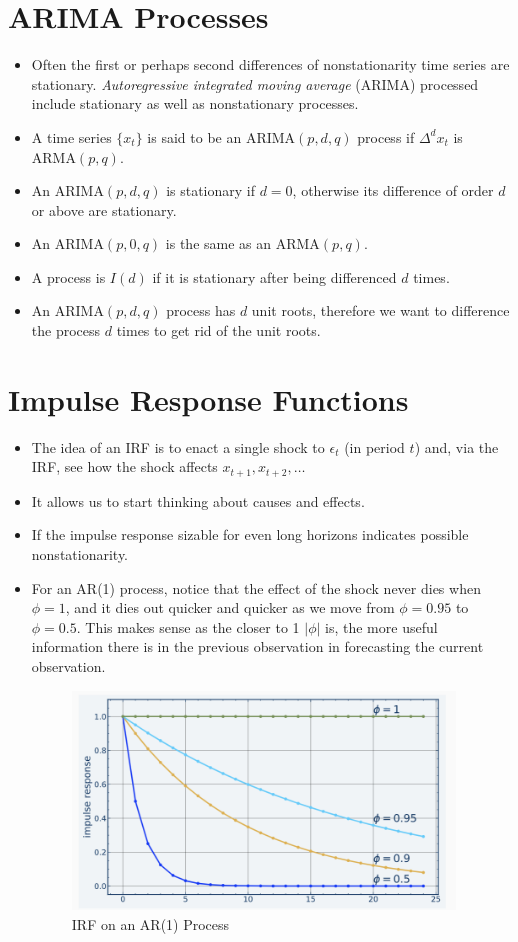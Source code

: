 \documentclass[11pt]{article}
\begin{document}
\section{ARIMA Processes}
\begin{itemize}
    \item Often the first or perhaps second differences of nonstationarity time series are 
    stationary. \textit{Autoregressive integrated moving average} (ARIMA) processed include 
    stationary as well as nonstationary processes.
    \item A time series $\{x_t\}$ is said to be an $\text{ARIMA}(p,d,q)$ process if $\Delta^d 
    x_t$ is $\text{ARMA}(p,q)$.
    \item An $\text{ARIMA}(p,d,q)$ is stationary if $d=0$, otherwise its difference of order 
    $d$ or above are stationary. 
    \item An $\text{ARIMA}(p,0,q)$ is the same as an $\text{ARMA}(p,q)$.
    \item A process is $I(d)$ if it is stationary after being differenced $d$ times.
    \item An $\text{ARIMA}(p,d,q)$ process has $d$ unit roots, therefore we want to difference 
    the process $d$ times to get rid of the unit roots. 
\end{itemize}

\section{Impulse Response Functions}
\begin{itemize}
    \item The idea of an IRF is to enact a single shock to $\epsilon_t$ (in period $t$) and,
    via the IRF, see how the shock affects $x_{t+1}, x_{t+2}, \ldots$
    \item It allows us to start thinking about causes and effects.
    \item If the impulse response sizable for even long horizons indicates possible 
    nonstationarity. 
    \item For an AR(1) process, notice that the effect of the shock never dies when $\phi=1$,
    and it dies out quicker and quicker as we move from $\phi=0.95$ to $\phi=0.5$. This makes 
    sense as the closer to 1 $|\phi|$ is, the more useful information there is in the previous 
    observation in forecasting the current observation.
    \begin{figure}[H] 
        \centering 
        \includegraphics[width=4in]{imgs/irf.png}
        \caption{IRF on an AR(1) Process}
    \end{figure}
\end{itemize}
\end{document}
